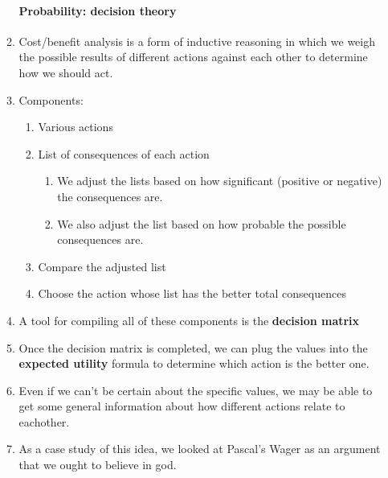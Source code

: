 \documentclass[10pt,landscape]{article}
\begin{document}
\begin{multicols}{2}
\begin{enumerate}
\begin{enumerate}
\paragraph{Probability: decision theory}
    \item Cost/benefit analysis is a form of inductive reasoning in which we weigh the possible results of different actions against each other to determine how we should act.
    \item Components:
      \begin{enumerate}
       \item Various actions
       \item List of consequences of each action
	\begin{enumerate}
	 \item We adjust the lists based on how significant (positive or negative) the consequences are.
	 \item We also adjust the list based on how probable the possible consequences are.
	\end{enumerate}
       \item Compare the adjusted list
       \item Choose the action whose list has the better total consequences
      \end{enumerate}
    \item A tool for compiling all of these components is the \textbf{decision matrix}
    \item Once the decision matrix is completed, we can plug the values into the \textbf{expected utility} formula to determine which action is the better one.
    \item Even if we can't be certain about the specific values, we may be able to get some general information about how different actions relate to eachother.
    \item As a case study of this idea, we looked at Pascal's Wager as an argument that we ought to believe in god.
  

\end{enumerate}
\end{enumerate}
\end{multicols}
\end{document}

